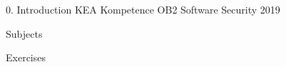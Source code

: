 \documentclass[Screen16to9,17pt]{foils}
\begin{document}
\mytitlepage
{0. Introduction}
{KEA Kompetence OB2 Software Security 2019}


\begin{list1}
\item Subjects
\begin{list2}
\item
\end{list2}
\item Exercises
\begin{list2}
\item 
\end{list2}
\end{list1}


\begin{list1}
\item
\item
\end{list1}



\begin{list1}
\item
\end{list1}

\end{document}
